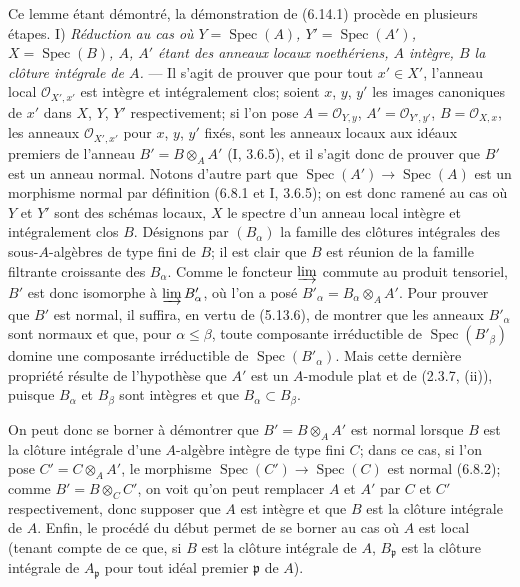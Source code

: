 Ce lemme étant démontré, la démonstration de (6.14.1) procède en plusieurs
étapes.
I) \emph{Réduction au cas où $Y=\operatorname{Spec}(A)$,
$Y'=\operatorname{Spec}(A')$, $X=\operatorname{Spec}(B)$, $A$, $A'$ étant
des anneaux locaux noethériens, $A$ intègre, $B$ la clôture intégrale de
$A$.} --- Il s'agit de prouver que pour tout $x'\in X'$, l'anneau local
$\mathcal O_{X',x'}$ est intègre et intégralement clos; soient $x$, $y$,
$y'$ les images canoniques de $x'$ dans $X$, $Y$, $Y'$ respectivement; si
l'on pose $A=\mathcal O_{Y,y}$, $A'=\mathcal O_{Y',y'}$,
$B=\mathcal O_{X,x}$, les anneaux $\mathcal O_{X',x'}$ pour $x$, $y$, $y'$
fixés, sont les anneaux locaux aux idéaux premiers de l'anneau
$B'=B\otimes_A A'$ (I, 3.6.5), et il s'agit donc de prouver que $B'$ est un
anneau normal. Notons d'autre part que
$\operatorname{Spec}(A')\to\operatorname{Spec}(A)$ est un morphisme normal
par définition (6.8.1 et I, 3.6.5); on est donc ramené au cas où $Y$ et $Y'$
sont des schémas locaux, $X$ le spectre d'un anneau local intègre et
intégralement clos $B$. Désignons par $(B_\alpha)$ la famille des clôtures
intégrales des sous-$A$-algèbres de type fini de $B$; il est clair que $B$
est réunion de la famille filtrante croissante des $B_\alpha$. Comme le
foncteur $\varinjlim$ commute au produit tensoriel, $B'$ est donc isomorphe
à $\varinjlim B'_\alpha$, où l'on a posé
$B'_\alpha=B_\alpha\otimes_A A'$. Pour prouver que $B'$ est normal, il
suffira, en vertu de (5.13.6), de montrer que les anneaux $B'_\alpha$ sont
normaux et que, pour $\alpha\leqslant\beta$, toute composante irréductible
de $\operatorname{Spec}(B'_\beta)$ domine une composante irréductible de
$\operatorname{Spec}(B'_\alpha)$. Mais cette dernière propriété résulte de
l'hypothèse que $A'$ est un $A$-module plat et de (2.3.7, (ii)), puisque
$B_\alpha$ et $B_\beta$ sont intègres et que $B_\alpha\subset B_\beta$.

On peut donc se borner à démontrer que $B'=B\otimes_A A'$ est normal lorsque
$B$ est la clôture intégrale d'une $A$-algèbre intègre de type fini $C$;
dans ce cas, si l'on pose $C'=C\otimes_A A'$, le morphisme
$\operatorname{Spec}(C')\to\operatorname{Spec}(C)$ est normal (6.8.2);
comme $B'=B\otimes_C C'$, on voit qu'on peut remplacer $A$ et $A'$ par $C$
et $C'$ respectivement, donc supposer que $A$ est intègre et que $B$ est la
clôture intégrale de $A$. Enfin, le procédé du début permet de se borner au
cas où $A$ est local (tenant compte de ce que, si $B$ est la clôture
intégrale de $A$, $B_\mathfrak p$ est la clôture intégrale de
$A_\mathfrak p$ pour tout idéal premier $\mathfrak p$ de $A$).

